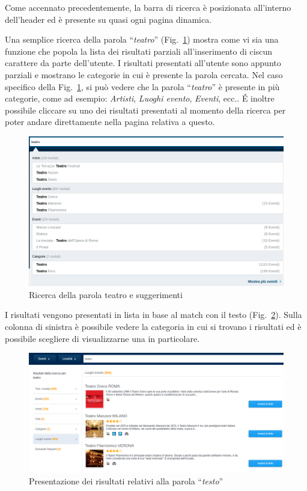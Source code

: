 	Come accennato precedentemente, la barra di ricerca è posizionata all'interno dell'header ed è presente su quasi ogni pagina dinamica.
	\par Una semplice ricerca della parola ``\textit{teatro}'' (Fig.~\ref{ricerca1}) mostra come vi sia una funzione che popola la lista dei risultati parziali all'inserimento di ciscun carattere da parte dell'utente.
	I risultati presentati all'utente sono appunto parziali e mostrano le categorie in cui è presente la parola cercata.
	Nel caso specifico della Fig.~\ref{ricerca1}, si può vedere che la parola ``\textit{teatro}'' è presente in più categorie, come ad esempio: \textit{Artisti}, \textit{Luoghi evento}, \textit{Eventi}, ecc..
	\'E inoltre possibile cliccare su uno dei risultati presentati al momento della ricerca per poter andare direttamente nella pagina relativa a questo.
	\begin{figure}[hbt]
		\centering
		\includegraphics[width=\textwidth]{img/ricerca_1.png}
		\caption{Ricerca della parola teatro e suggerimenti}
		\label{ricerca1}
	\end{figure}
	I risultati vengono presentati in lista in base al match con il testo (Fig.~\ref{ricerca2}).
	Sulla colonna di sinistra è possibile vedere la categoria in cui si trovano i risultati ed è possibile scegliere di visualizzarne una in particolare.
	\begin{figure}[hbt]
		\centering
		\includegraphics[width=\textwidth]{img/ricerca_2.png}
		\caption{Presentazione dei risultati relativi alla parola ``\textit{testo}''}
		\label{ricerca2}
	\end{figure}

